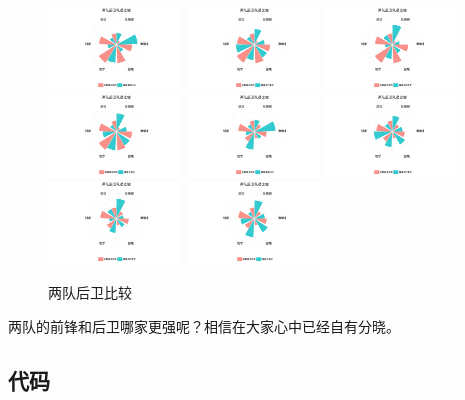 \documentclass[12pt,a4paper,onecolumn]{article}
\begin{document}
\begin{figure}[H]
\centering
\includegraphics[width=100pt]{后卫2957.pdf}
\includegraphics[width=100pt]{后卫7257.pdf}
\includegraphics[width=100pt]{后卫7357.pdf}
\includegraphics[width=100pt]{后卫9257.pdf}
\includegraphics[width=100pt]{后卫2995.pdf}
\includegraphics[width=100pt]{后卫7295.pdf}
\includegraphics[width=100pt]{后卫7395.pdf}
\includegraphics[width=100pt]{后卫9295.pdf}
\caption{\small{两队后卫比较}}
\end{figure}

两队的前锋和后卫哪家更强呢？相信在大家心中已经自有分晓。

\subsection{代码}


\end{document}
